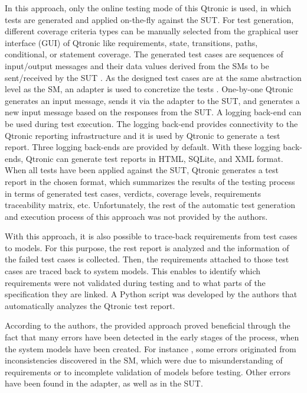 In this approach, only the online testing mode of this Qtronic is used, in which tests are generated and applied on-the-fly against the SUT. For test generation, different coverage criteria types can be manually selected from the graphical user interface (GUI) of Qtronic like requirements, state, transitions, paths, conditional, or statement coverage. The generated test cases are sequences of input/output messages and their data values derived from the SMs to be sent/received by the SUT \cite{SMvsTM}. As the designed test cases are at the same abstraction level as the SM, an adapter is used to concretize the tests \cite{SMvsTM}. One-by-one Qtronic generates an input message, sends it via the adapter to the SUT, and generates a new input message based on the responses from the SUT. A logging back-end can be used during test execution. The logging back-end provides connectivity to the Qtronic reporting infrastructure and it is used by Qtronic to generate a test report. Three logging back-ends are provided by default. With these logging back-ends, Qtronic can generate test reports in HTML, SQLite, and XML format. When all tests have been applied against the SUT, Qtronic generates a test report in the chosen format, which summarizes the results of the testing process in terms of generated test cases, verdicts, coverage levels, requirements traceability matrix, etc. Unfortunately, the rest of the automatic test generation and execution process of this approach was not provided by the authors. 

With this approach, it is also possible to trace-back requirements from test cases to models. For this purpose, the rest report is analyzed and the information of the failed test cases is collected. Then, the requirements attached to those test cases are traced back to system models. This enables to identify which requirements were not validated during testing and to what parts of the specification they are linked. A Python script was developed by the authors that automatically analyzes the Qtronic test report. 

According to the authors, the provided approach proved beneficial through the fact that many errors have been detected in the early stages of the process, when the system models have been created. For instance \cite{SMvsTM}, some errors originated from inconsistencies discovered in the SM, which were due to misunderstanding of requirements or to incomplete validation of models before testing. Other errors have been found in the adapter, as well as in the SUT.


